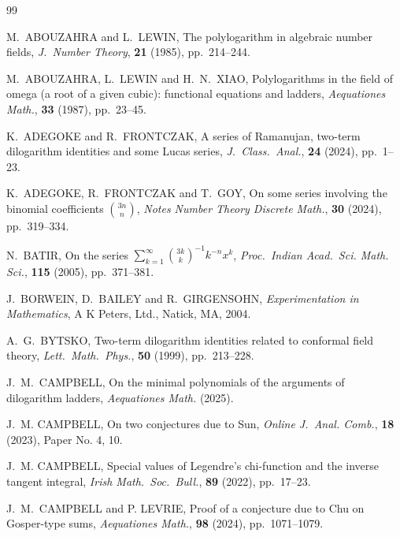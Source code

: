 \documentclass[12pt]{article}
\begin{document}
\begin{thebibliography}{99}

 M.\ ABOUZAHRA and L.\ LEWIN, 
 The polylogarithm in algebraic number fields, 
 \textit{J.\ Number Theory}, \textbf{21} (1985), pp.\ 214--244. 

 M.\ ABOUZAHRA, L.\ LEWIN and H.\ N.\ XIAO, 
 Polylogarithms in the field of omega (a root of a given cubic): functional equations and ladders, 
 \textit{Aequationes Math.}, \textbf{33} (1987), pp.\ 23--45. 

 K.\ ADEGOKE and R.\ FRONTCZAK, 
 A series of {R}amanujan, two-term dilogarithm identities and some {L}ucas series, 
 \textit{J.\ Class.\ Anal.}, \textbf{24} (2024), pp.\ 1--23. 

 K.\ ADEGOKE, R.\ FRONTCZAK and T.\ GOY, 
 On some series involving the binomial coefficients $\binom{3n}{n}$, 
 \textit{Notes Number Theory Discrete Math.}, \textbf{30} (2024), pp.\ 319--334. 

 N.\ BATIR, 
 On the series {$\sum^\infty_{k = 1}{\binom{3k}{k}}^{-1}k^{-n}x^k$}, 
 \textit{Proc.\ Indian Acad.\ Sci. Math. Sci.}, \textbf{115} (2005), pp.\ 371--381. 

 J.\ BORWEIN, D.\ BAILEY and R.\ GIRGENSOHN, 
 \textit{Experimentation in Mathematics}, 
 A K Peters, Ltd., Natick, MA, 2004. 

 A.\ G.\ BYTSKO, 
 Two-term dilogarithm identities related to conformal field theory, 
 \textit{Lett.\ Math.\ Phys.}, \textbf{50} (1999), pp.\ 213--228. 

 J.\ M.\ CAMPBELL, 
 On the minimal polynomials of the arguments of dilogarithm ladders, 
 \textit{Aequationes Math.} (2025). 

 J.\ M. CAMPBELL, 
 On two conjectures due to {S}un, 
 \textit{Online J.\ Anal. Comb.}, \textbf{18} (2023), Paper No. 4, 10. 

 J.\ M. CAMPBELL, 
 Special values of {L}egendre's chi-function and the inverse tangent integral, 
 \textit{Irish Math.\ Soc.\ Bull.}, \textbf{89} (2022), pp.\ 17--23. 

 J.\ M.\ CAMPBELL and P. LEVRIE, 
 Proof of a conjecture due to {C}hu on {G}osper-type sums, 
 \textit{Aequationes Math.}, \textbf{98} (2024), pp.\ 1071--1079. 


\end{thebibliography}
\end{document}
